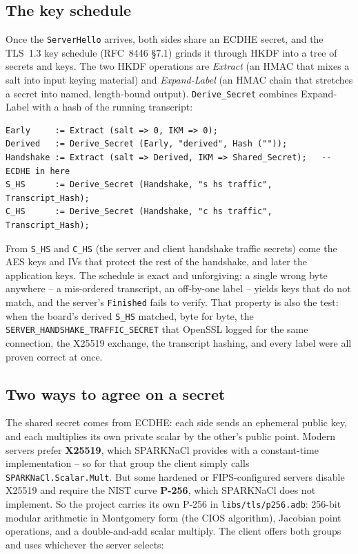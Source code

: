 \subsection{The key schedule}

Once the \texttt{ServerHello} arrives, both sides share an ECDHE secret, and the
TLS~1.3 key schedule (RFC~8446 \S7.1) grinds it through HKDF into a tree of
secrets and keys. The two HKDF operations are \emph{Extract} (an HMAC that mixes a
salt into input keying material) and \emph{Expand-Label} (an HMAC chain that
stretches a secret into named, length-bound output). \texttt{Derive\_Secret}
combines Expand-Label with a hash of the running transcript:

\begin{lstlisting}
Early     := Extract (salt => 0, IKM => 0);
Derived   := Derive_Secret (Early, "derived", Hash (""));
Handshake := Extract (salt => Derived, IKM => Shared_Secret);   --  ECDHE in here
S_HS      := Derive_Secret (Handshake, "s hs traffic", Transcript_Hash);
C_HS      := Derive_Secret (Handshake, "c hs traffic", Transcript_Hash);
\end{lstlisting}

From \texttt{S\_HS} and \texttt{C\_HS} (the server and client handshake traffic
secrets) come the AES keys and IVs that protect the rest of the handshake, and
later the application keys. The schedule is exact and unforgiving: a single wrong
byte anywhere -- a mis-ordered transcript, an off-by-one label -- yields keys that
do not match, and the server's \texttt{Finished} fails to verify. That property is
also the test: when the board's derived \texttt{S\_HS} matched, byte for byte, the
\texttt{SERVER\_HANDSHAKE\_TRAFFIC\_SECRET} that OpenSSL logged for the same
connection, the X25519 exchange, the transcript hashing, and every label were all
proven correct at once.

\subsection{Two ways to agree on a secret}
\label{ch:tls:ecdhe}

The shared secret comes from ECDHE: each side sends an ephemeral public key, and
each multiplies its own private scalar by the other's public point. Modern servers
prefer \textbf{X25519}, which SPARKNaCl provides with a constant-time
implementation -- so for that group the client simply calls
\texttt{SPARKNaCl.Scalar.Mult}. But some hardened or FIPS-configured servers
disable X25519 and require the NIST curve \textbf{P-256}, which SPARKNaCl does not
implement. So the project carries its own P-256 in \texttt{libs/tls/p256.adb}:
256-bit modular arithmetic in Montgomery form (the CIOS algorithm), Jacobian point
operations, and a double-and-add scalar multiply. The client offers both groups
and uses whichever the server selects:

